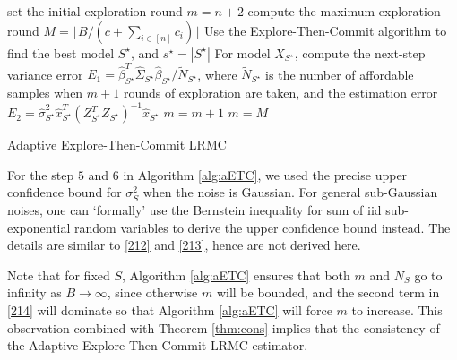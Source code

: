 \documentclass[11pt,a4paper]{amsart}
\numberwithin{equation}{section}
\theoremstyle{plain}
\theoremstyle{definition}
\def\E{{\mathbb E}}
\begin{document}
\medskip

\begin{algorithm}[H]
 \begin{algorithmic}[1]
 \STATE set the initial exploration round $m=n+2$
 \STATE compute the maximum exploration round $M = \lfloor B/(c+\sum_{i\in [n]}c_i)\rfloor$
 \STATE Use the Explore-Then-Commit algorithm to find the best model $S^\star$, and $s^\star = |S^\star|$
 \STATE For model $X_{S^\star}$, compute the next-step variance error $E_1 = \widehat{\beta}_{S^\star}^T\widehat{\Sigma}_{S^\star}\widehat{\beta}_{S^\star}/\tilde{N}_{S^\star}$, where $\tilde{N}_{S^\star}$ is the number of affordable samples when $m+1$ rounds of exploration are taken, and the estimation error $E_2 = \widehat{\sigma}_{S^\star}^2\widehat{x}_{S^\star}^T(Z_{S^\star}^TZ_{S^\star})^{-1}\widehat{x}_{S^\star}$
        \STATE $m = m + 1$
    \ELSE
        \STATE $m = M$
     \ENDIF
 \ENDWHILE
\STATE{return $\widehat{\E[Y]}_{S^\star}$}
 \end{algorithmic}
\caption{Adaptive Explore-Then-Commit LRMC} 
\label{alg:aETC}
\end{algorithm}

For the step $5$ and $6$ in Algorithm \ref{alg:aETC}, we used the precise upper confidence bound for $\sigma_S^2$ when the noise is Gaussian. 
For general sub-Gaussian noises, one can `formally' use the Bernstein inequality for sum of iid sub-exponential random variables to derive the upper confidence bound instead. The details are similar to \eqref{212} and \eqref{213}, hence are not derived here. 

Note that for fixed $S$, Algorithm \ref{alg:aETC} ensures that both $m$ and $N_S$ go to infinity as $B\to\infty$, since otherwise $m$ will be bounded, and the second term in \eqref{214} will dominate so that Algorithm \ref{alg:aETC} will force $m$ to increase. This observation combined with Theorem \ref{thm:cons} implies that the consistency of the Adaptive Explore-Then-Commit LRMC estimator. 
\end{document}
